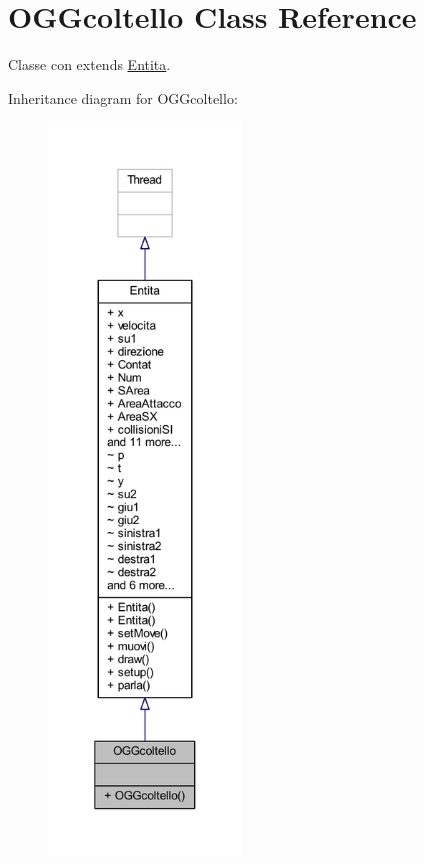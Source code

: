 \hypertarget{classoggetti_1_1_o_g_gcoltello}{}\section{O\+G\+Gcoltello Class Reference}
\label{classoggetti_1_1_o_g_gcoltello}


Classe con extends \hyperlink{namespace_entita}{Entita}.  




Inheritance diagram for O\+G\+Gcoltello\+:
\nopagebreak
\begin{figure}[H]
\begin{center}
\leavevmode
\includegraphics[height=550pt]{classoggetti_1_1_o_g_gcoltello__inherit__graph}
\end{center}
\end{figure}



